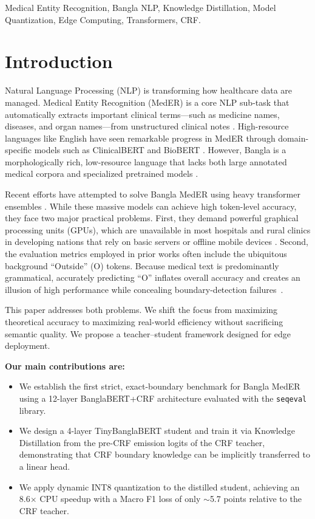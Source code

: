 \documentclass[conference]{IEEEtran}
\begin{document}
\begin{IEEEkeywords}
Medical Entity Recognition, Bangla NLP, Knowledge Distillation, Model Quantization, Edge Computing, Transformers, CRF.
\end{IEEEkeywords}

\section{Introduction}

Natural Language Processing (NLP) is transforming how healthcare data are managed. Medical Entity Recognition (MedER) is a core NLP sub-task that automatically extracts important clinical terms---such as medicine names, diseases, and organ names---from unstructured clinical notes \cite{b1}. High-resource languages like English have seen remarkable progress in MedER through domain-specific models such as ClinicalBERT and BioBERT \cite{b2,b3}. However, Bangla is a morphologically rich, low-resource language that lacks both large annotated medical corpora and specialized pretrained models \cite{b4}.

Recent efforts have attempted to solve Bangla MedER using heavy transformer ensembles \cite{b5}. While these massive models can achieve high token-level accuracy, they face two major practical problems. First, they demand powerful graphical processing units (GPUs), which are unavailable in most hospitals and rural clinics in developing nations that rely on basic servers or offline mobile devices \cite{b6}. Second, the evaluation metrics employed in prior works often include the ubiquitous background ``Outside'' (O) tokens. Because medical text is predominantly grammatical, accurately predicting ``O'' inflates overall accuracy and creates an illusion of high performance while concealing boundary-detection failures~\cite{b7}.

This paper addresses both problems. We shift the focus from maximizing theoretical accuracy to maximizing real-world efficiency without sacrificing semantic quality. We propose a teacher--student framework designed for edge deployment.

\textbf{Our main contributions are:}
\begin{itemize}
    \item We establish the first strict, exact-boundary benchmark for Bangla MedER using a 12-layer BanglaBERT+CRF architecture evaluated with the \texttt{seqeval} library.
    \item We design a 4-layer TinyBanglaBERT student and train it via Knowledge Distillation from the pre-CRF emission logits of the CRF teacher, demonstrating that CRF boundary knowledge can be implicitly transferred to a linear head.
    \item We apply dynamic INT8 quantization to the distilled student, achieving an 8.6$\times$ CPU speedup with a Macro F1 loss of only $\sim$5.7 points relative to the CRF teacher.
\end{itemize}
\end{document}
